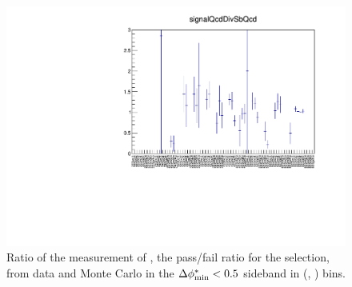 \begin{figure}[h!]
  \begin{center}        
    \includegraphics[width=\textwidth]{figures/qcd/plots/doubleQcdSbSrRatio1D}
    \caption{ Ratio of the measurement of \rmhtmet, the pass/fail ratio for the \mhtmet selection, from data and Monte Carlo in the $\mbox{$\Delta\phi^{*}_{\rm min}$} < 0.5$ sideband in (\scalht, \njet) bins.  
    }

    \label{fig:RR_qcd}
  \end{center} 
\end{figure}


